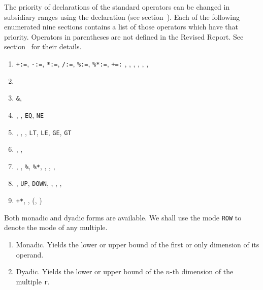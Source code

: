 The priority of declarations of the standard operators can be changed
in subsidiary ranges using the 
declaration (see section~). Each of the following
enumerated nine sections contains a list of those operators which
have that priority.  Operators in parentheses are not defined in the
Revised Report. See section~ for their details.
\goodbreak
\begin{enumerate}
\item \verb|+:=|, \verb|-:=|, \verb|*:=|, \verb|/:=|,
\verb|%:=|, \verb|%*:=|, \verb|+=:|\newline
{}, , , ,
, , 
\item {}
\item \verb|&|, 
\item \ixtt{=}, \ixtt{/=}, \verb|EQ|, \verb|NE|
\item \ixtt{<}, \ixtt{<=}, \ixtt{>=}, \ixtt{>} \newline
\verb|LT|, \verb|LE|, \verb|GE|, \verb|GT|
\item \ixtt{-}, \ixtt{+},
\item \ixtt{*}, \ixtt{/}, \verb|%|, \verb|%*|,\newline
{}, , ,
\item \ixtt{**}, \verb|UP|, \verb|DOWN|, ,
, , 
\item \verb|+*|, , (, )
\end{enumerate}

Both monadic and dyadic forms are available. We shall use the mode
\verb|ROW| to denote the mode of any multiple.
\begin{enumerate}
\item Monadic.\newline
{}\newline
{}\newline
Yields the lower or upper bound of the first or only dimension of its
operand.
\item Dyadic.\newline
{}\newline
{}\newline
Yields the lower or upper bound of the $n$-th dimension of the
multiple \verb|r|.
\end{enumerate}

